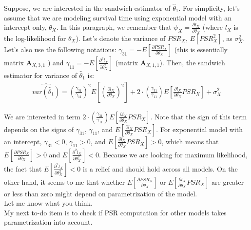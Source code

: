 \documentclass[]{article}
\begin{document}
\begin{enumerate}[1)]
Suppose, we are interested in the sandwich estimator of $\hat{\theta}_1$. For simplicity, let's assume that we are modeling survival time using exponential model with an intercept only, $\theta_X$. In this paragraph, we remember that $\psi_X = \frac{\partial l_X}{\partial \theta_X}$ (where $l_X$ is the log-likelihood for $\theta_X$). Let's denote the variance of $PSR_X$, $E\left[PSR_X^2 \right]$,  as $\sigma^2_X$. Let's also use the following notations: $\gamma_{31} = -E\left[ \frac{\partial PSR_X}{\partial \theta_X} \right]$ (this is essentially matrix $\pmb{A}_{X,3,1}$ ) and $\gamma_{11} = -E\left[ \frac{\partial^2 l_X}{\partial \theta_X^2} \right]$ (matrix $\pmb{A}_{X,1,1}$). Then, the sandwich estimator for variance of $\hat{\theta}_1$ is:
  $$
  \begin{aligned}
    \widehat{var(\hat{\theta}_1)} = \left(  \frac{\gamma_{31}}{\gamma_{11}} \right)^2    E\left[ \left(\frac{\partial l_X}{\partial \theta_X} \right)^2  \right]   + 2\cdot  \left( \frac{\gamma_{31}}{\gamma_{11}}  \right)   E\left[\frac{\partial l_X}{\partial \theta_X}  PSR_X  \right]  + \sigma^2_X
  \end{aligned}
  $$

We are interested in term $2\cdot  \left( \frac{\gamma_{31}}{\gamma_{11}}  \right)   E\left[\frac{\partial l_X}{\partial \theta_X}  PSR_X  \right]$. Note that the sign of this term depends on the signs of $\gamma_{31}$, $\gamma_{11}$, and $E\left[\frac{\partial l_X}{\partial \theta_X}  PSR_X  \right]$. For exponential model with an intercept, $\gamma_{31}<0$, $\gamma_{11}>0$, and $E\left[\frac{\partial l_X}{\partial \theta_X}  PSR_X  \right]>0$, which means that $E\left[ \frac{\partial PSR_X}{\partial \theta_X} \right]>0$ and $E\left[ \frac{\partial^2 l_X}{\partial \theta_X^2} \right] < 0$. Because we are looking for maximum likelihood, the fact that $E\left[ \frac{\partial^2 l_X}{\partial \theta_X^2} \right] < 0$ is a relief and should hold across all models. On the other hand, it seems to me that whether $E\left[ \frac{\partial PSR_X}{\partial \theta_X} \right]$ or $E\left[\frac{\partial l_X}{\partial \theta_X}  PSR_X  \right]$ are greater or less than zero might depend on parametrization of the model.\\
Let me know what you think.\\
My next to-do item is to check if PSR computation for other models takes parametrization into account.



\end{enumerate}
\end{document}
